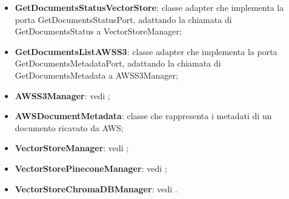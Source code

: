 \documentclass[10pt, a4paper]{article}
\begin{document}
\begin{itemize}
    \item \label{GetDocumentsStatusVectorStore}\textbf{GetDocumentsStatusVectorStore}: classe adapter che implementa la porta GetDocumentsStatusPort, adattando la chiamata di GetDocumentsStatus a VectorStoreManager;
    \item \label{GetDocumentsListAWSS3}\textbf{GetDocumentsListAWSS3}: classe adapter che implementa la porta GetDocumentsMetadataPort, adattando la chiamata di GetDocumentsMetadata a AWSS3Manager;
    \item \textbf{AWSS3Manager}: vedi ;
    \item \label{AWSDocumentMetadata}\textbf{AWSDocumentMetadata}: classe che rappresenta i metadati di un documento ricavato da AWS;
    \item \textbf{VectorStoreManager}: vedi ;
    \item \textbf{VectorStorePineconeManager}: vedi ;
    \item \textbf{VectorStoreChromaDBManager}: vedi .
\end{itemize}
\end{document}
